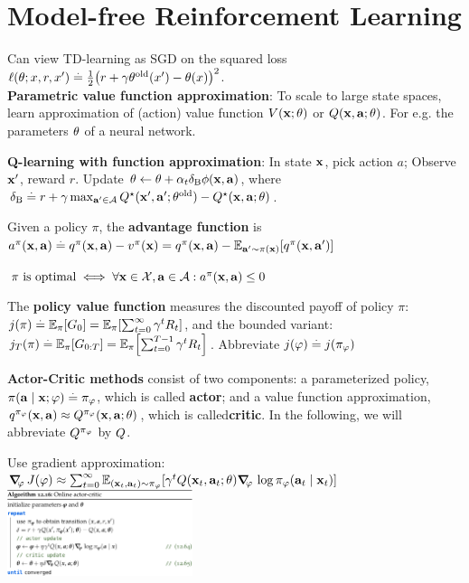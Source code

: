 \section{Model-free Reinforcement Learning}
Can view TD-learning as SGD on the squared loss $\ell(\vtheta; x, r, x') \defeq \frac{1}{2}\parentheses*{r + \gamma \old{\vtheta}(x') - \vtheta(x)}^2$. \\
\textbf{Parametric value function approximation}: To scale to large state spaces, learn approximation
of (action) value function $\V{\vx; \vtheta}$ or $\Q{\vx}{\va; \vtheta}$. For e.g. the parameters $\mathbf{\theta}$ of a neural network.
\begin{framed}
    \textbf{Q-learning with function approximation}: In state $\mathbf{x}$, pick action $a$; Observe $\mathbf{x}'$, reward $r$. Update $\mathbf{\theta} \gets \mathbf{\theta} + \alpha_t \delta_\mathrm{B} \mathbf{\phi}(\mathbf{x}, \mathbf{a})$, where $\delta_\mathrm{B} \defeq r + \gamma \max_{\vap \in \spA} \Q*{\vxp}{\vap; \old{\vtheta}} - \Q*{\vx}{\va; \vtheta}$.
\end{framed}
\begin{framed}
    Given a policy $\pi$, the \textbf{advantage function} is $\a[\pi]{\vx}{\va} \defeq \q[\pi]{\vx}{\va} - \v[\pi]{\vx} = \q[\pi]{\vx}{\va} - \E[\vap \sim \pi(\vx)]{\q[\pi]{\vx}{\vap}}$
\end{framed}
$\text{$\pi$ is optimal} \iff \forall \vx \in \spX, \va \in \spA : \a[\pi]{\vx}{\va} \leq 0$
\begin{framed}
    The \textbf{policy value function} measures the discounted payoff of policy $\pi$: $\j{\pi} \defeq \E[\pi]{G_0} = \E[\pi]{\sum_{t=0}^\infty \gamma^t R_t}$, and the bounded variant: $\j{\pi}[T] \defeq \E[\pi]{G_{0:T}} = \E[\pi]{\sum_{t=0}^{T-1} \gamma^t R_t}$. Abbreviate $\j{\vvarphi} \defeq \j{\pi_\vvarphi}$
\end{framed}
\begin{framed}
  \textbf{Actor-Critic methods} consist of two components: a parameterized policy, $\pi(\mathbf{a} \mid \mathbf{x}; \mathbf{\varphi}) \overset{.}{=} \pi_{\mathbf{\varphi}}$, which is called \textbf{actor}; and a value function approximation, $\q[\pi_\vvarphi]{\vx}{\va} \approx \Q[\pi_\vvarphi]{\vx}{\va; \vtheta}$, which is called\textbf{critic}.
  In the following, we will abbreviate $\fnQ[\pi_\vvarphi]$ by $\fnQ$.
\end{framed}
Use gradient approximation: 
\tiny{$\grad_\vvarphi \J{\vvarphi} \approx \sum_{t=0}^\infty\E[(\vx_t,\va_t) \sim \pi_\vvarphi]{\gamma^t \Q{\vx_t}{\va_t; \vtheta} \grad_\vvarphi \log \pi_\vvarphi(\va_t \mid \vx_t)}$}
\includegraphics[width=0.95\linewidth, trim={0 0 4cm 0}, height=2.5cm]{Online_actor_critic.png}